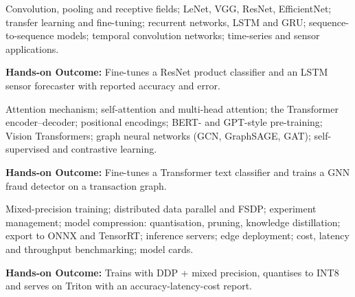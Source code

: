 \documentclass[10pt,a4paper]{article}
\begin{document}
\begin{tcolorbox}[unitbox,title={{\color{gold}UNIT III}\quad Convolutional and Sequence Architectures\hfill{\color{gold}9 Hours}}]\small Convolution, pooling and receptive fields; LeNet, VGG, ResNet, EﬀicientNet; transfer learning and fine-tuning; recurrent networks, LSTM and GRU; sequence-to-sequence models; temporal convolution networks; time-series and sensor applications.\par\vspace{2pt}\par\textbf{Hands-on Outcome:} Fine-tunes a ResNet product classifier and an LSTM sensor forecaster with reported accuracy and error.\end{tcolorbox}
\begin{tcolorbox}[unitbox,title={{\color{gold}UNIT IV}\quad Attention, Transformers and Graph Networks\hfill{\color{gold}9 Hours}}]\small Attention mechanism; self-attention and multi-head attention; the Transformer encoder–decoder; positional encodings; BERT- and GPT-style pre-training; Vision Transformers; graph neural networks (GCN, GraphSAGE, GAT); self-supervised and contrastive learning.\par\vspace{2pt}\par\textbf{Hands-on Outcome:} Fine-tunes a Transformer text classifier and trains a GNN fraud detector on a transaction graph.\end{tcolorbox}
\begin{tcolorbox}[unitbox,title={{\color{gold}UNIT V}\quad Scalable Training and Production Inference\hfill{\color{gold}9 Hours}}]\small Mixed-precision training; distributed data parallel and FSDP; experiment management; model compression: quantisation, pruning, knowledge distillation; export to ONNX and TensorRT; inference servers; edge deployment; cost, latency and throughput benchmarking; model cards.\par\vspace{2pt}\par\textbf{Hands-on Outcome:} Trains with DDP + mixed precision, quantises to INT8 and serves on Triton with an accuracy-latency-cost report.\end{tcolorbox}
\end{document}
